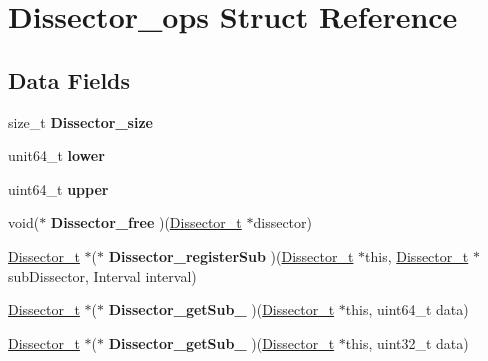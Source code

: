 \hypertarget{struct_dissector__ops}{}\section{Dissector\+\_\+ops Struct Reference}
\label{struct_dissector__ops}
\subsection*{Data Fields}
\begin{DoxyCompactItemize}
\item 
\hypertarget{struct_dissector__ops_a8982a0368e988bc9cb93ee83d5411b99}{}size\+\_\+t {\bfseries Dissector\+\_\+size}\label{struct_dissector__ops_a8982a0368e988bc9cb93ee83d5411b99}

\item 
\hypertarget{struct_dissector__ops_a13ef934ff5a0afd1ee9f2b553434e2ae}{}unit64\+\_\+t {\bfseries lower}\label{struct_dissector__ops_a13ef934ff5a0afd1ee9f2b553434e2ae}

\item 
\hypertarget{struct_dissector__ops_a3fe6b9c98a06d39a2fb1a2bc707cc490}{}uint64\+\_\+t {\bfseries upper}\label{struct_dissector__ops_a3fe6b9c98a06d39a2fb1a2bc707cc490}

\item 
\hypertarget{struct_dissector__ops_aa783c09975ec10c4b01884938d543346}{}void($\ast$ {\bfseries Dissector\+\_\+free} )(\hyperlink{struct_dissector}{Dissector\+\_\+t} $\ast$dissector)\label{struct_dissector__ops_aa783c09975ec10c4b01884938d543346}

\item 
\hypertarget{struct_dissector__ops_a66cf6888070f1e49cfa555ef28a96f8a}{}\hyperlink{struct_dissector}{Dissector\+\_\+t} $\ast$($\ast$ {\bfseries Dissector\+\_\+register\+Sub} )(\hyperlink{struct_dissector}{Dissector\+\_\+t} $\ast$this, \hyperlink{struct_dissector}{Dissector\+\_\+t} $\ast$sub\+Dissector, Interval interval)\label{struct_dissector__ops_a66cf6888070f1e49cfa555ef28a96f8a}

\item 
\hypertarget{struct_dissector__ops_ab6ec6226172ec0adccf96ef5703ad09d}{}\hyperlink{struct_dissector}{Dissector\+\_\+t} $\ast$($\ast$ {\bfseries Dissector\+\_\+get\+Sub\+\_} )(\hyperlink{struct_dissector}{Dissector\+\_\+t} $\ast$this, uint64\+\_\+t data)\label{struct_dissector__ops_ab6ec6226172ec0adccf96ef5703ad09d}

\item 
\hypertarget{struct_dissector__ops_a0f1b04b8f7e8af8621a3c86432c62e2f}{}\hyperlink{struct_dissector}{Dissector\+\_\+t} $\ast$($\ast$ {\bfseries Dissector\+\_\+get\+Sub\+\_} )(\hyperlink{struct_dissector}{Dissector\+\_\+t} $\ast$this, uint32\+\_\+t data)\label{struct_dissector__ops_a0f1b04b8f7e8af8621a3c86432c62e2f}


\end{DoxyCompactItemize}
